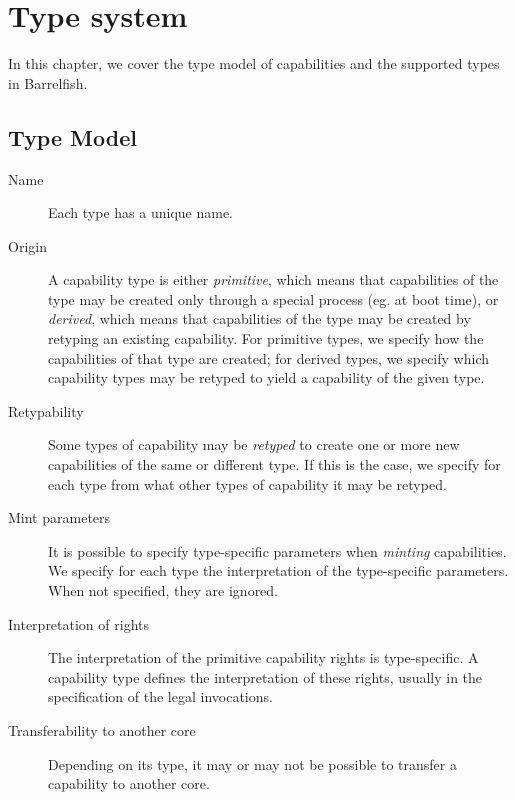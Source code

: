 \chapter{Type system}\label{chap:type_system}

In this chapter, we cover the type model of capabilities and the
supported types in Barrelfish.

\section{Type Model}
    
\begin{description}
\item[Name] Each type has a unique name.

\item[Origin] A capability type is either \emph{primitive}, which
  means that capabilities of the type may be created only through a
  special process (eg. at boot time), or \emph{derived}, which means
  that capabilities of the type may be created by retyping an existing
  capability. For primitive types, we specify how the capabilities of
  that type are created; for derived types, we specify which
  capability types may be retyped to yield a capability of the given
  type.

\item[Retypability] Some types of capability may be \emph{retyped} to
  create one or more new capabilities of the same or different
  type. If this is the case, we specify for each type from what other types of
  capability it may be retyped.

\item[Mint parameters] It is possible to specify type-specific
  parameters when \emph{minting} capabilities. We specify for each
  type the interpretation of the type-specific parameters. When not
  specified, they are ignored.

\item[Interpretation of rights] The interpretation of the primitive
  capability rights is type-specific. A capability type defines the
  interpretation of these rights, usually in the specification of the
  legal invocations.

\item[Transferability to another core] Depending on its type, it may
  or may not be possible to transfer a capability to another core.


\end{description}
